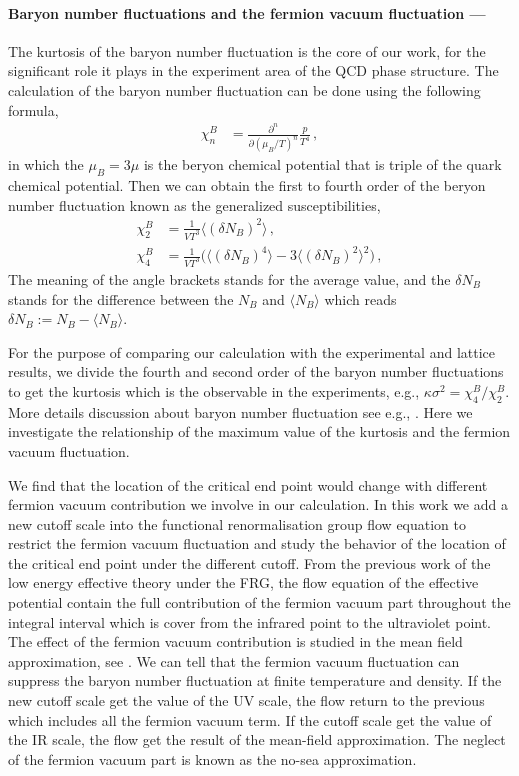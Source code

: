 \documentclass[%
reprint,
superscriptaddress,
showpacs,preprintnumbers,
 amsmath,amssymb,
 aps,
prl,
]{revtex4-1}
\begin{document}
\paragraph*{Baryon number fluctuations and the fermion vacuum fluctuation ---\!\!\!}
\label{sec:EoS}
The kurtosis of the baryon number fluctuation is the core of our work, for the significant role it plays in the experiment area of the QCD phase structure. The calculation of the baryon number fluctuation can be done using the following formula, 
\begin{align}
   \chi_n^{B}&=\frac{\partial^n}{\partial (\mu_B/T)^n}\frac{p}{T^4}\,,\label{eq:suscept}
\end{align}
in which the $\mu_B=3\mu$ is the beryon chemical potential that is triple of the quark chemical potential. Then we can obtain the first to fourth order of the beryon number fluctuation known as the generalized susceptibilities,
\begin{align}
  \chi_2^B&=\frac{1}{VT^3}\langle(\delta N_B)^2\rangle\,,\\[2ex]
  \chi_4^B&=\frac{1}{VT^3}\Big(\langle(\delta N_B)^4\rangle-3\langle(\delta N_B)^2\rangle^2\Big)\,,
\end{align}
The meaning of the angle brackets stands for the average value, and the $\delta N_B$ stands for the difference between the $N_B$ and $\langle N_B\rangle$ which reads $\delta N_B:=N_B - \langle N_B\rangle$.\par For the purpose of comparing our calculation with the experimental and lattice results, we divide the fourth and second order of the baryon number fluctuations to get the kurtosis which is the observable in the experiments, e.g., $\kappa\sigma^2=\chi^B_4/\chi^B_2$. More details discussion about baryon number fluctuation see e.g., \cite{Fu:2015naa}. Here we investigate the relationship of the maximum value of the kurtosis and the fermion vacuum fluctuation.
\par We find that the location of the critical end point would change with different fermion vacuum contribution we involve in our calculation. In this work we add a new cutoff scale into the functional renormalisation group flow equation to restrict the fermion vacuum fluctuation and study the behavior of the location of the critical end point under the different cutoff. From the previous work of the low energy effective theory under the FRG, the flow equation of the effective potential contain the full contribution of the fermion vacuum part throughout the integral interval which is cover from the infrared point to the ultraviolet point. The effect of the fermion vacuum contribution is studied in the mean field approximation, see \cite{Skokov:2010sf}. We can tell that the fermion vacuum fluctuation can suppress the baryon number fluctuation at finite temperature and density. If the new cutoff scale get the value of the UV scale, the flow return to the previous which includes all the fermion vacuum term. If the cutoff scale get the value of the IR scale, the flow get the result of the mean-field approximation. The neglect of the fermion vacuum part is known as the no-sea approximation.
\end{document}

